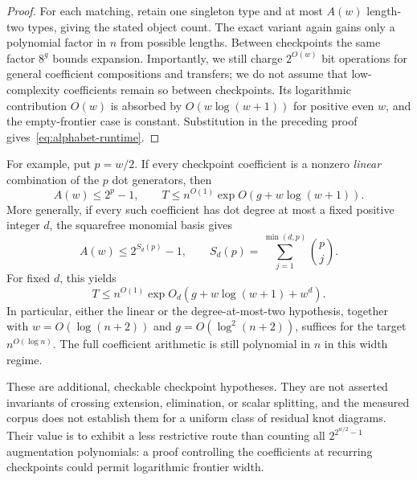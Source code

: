 \begin{proof}
For each matching, retain one singleton type and at most $A(w)$
length-two types, giving the stated object count. The exact variant
again gains only a polynomial factor in $n$ from possible lengths.
Between checkpoints the same factor $8^g$ bounds expansion. Importantly,
we still charge $2^{O(w)}$ bit operations for general coefficient
compositions and transfers; we do not assume that low-complexity
coefficients remain so between checkpoints. Its logarithmic contribution
$O(w)$ is absorbed by $O(w\log(w+1))$ for positive even $w$, and the
empty-frontier case is constant. Substitution in the preceding proof
gives~\eqref{eq:alphabet-runtime}.
\end{proof}

For example, put $p=w/2$. If every checkpoint coefficient is a nonzero
\emph{linear} combination of the $p$ dot generators, then
\[
 A(w)\le2^p-1,
 \qquad
 T\le n^{O(1)}\exp O\!\left(g+w\log(w+1)\right).
\]
More generally, if every such coefficient has dot degree at most a
fixed positive integer $d$, the squarefree monomial basis gives
\begin{equation}\label{eq:degree-alphabet}
 A(w)\le2^{S_d(p)}-1,
 \qquad
 S_d(p)=\sum_{j=1}^{\min(d,p)}\binom pj.
\end{equation}
For fixed $d$, this yields
\[
 T\le n^{O(1)}\exp O_d\!\left(g+w\log(w+1)+w^d\right).
\]
In particular, either the linear or the degree-at-most-two hypothesis,
together with $w=O(\log(n+2))$ and $g=O(\log^2(n+2))$, suffices for
the target $n^{O(\log n)}$. The full coefficient arithmetic is still
polynomial in $n$ in this width regime.

These are additional, checkable checkpoint hypotheses. They are not
asserted invariants of crossing extension, elimination, or scalar
splitting, and the measured corpus does not establish them for a
uniform class of residual knot diagrams. Their value is to exhibit a
less restrictive route than counting all $2^{2^{w/2}-1}$ augmentation
polynomials: a proof controlling the coefficients at recurring
checkpoints could permit logarithmic frontier width.
